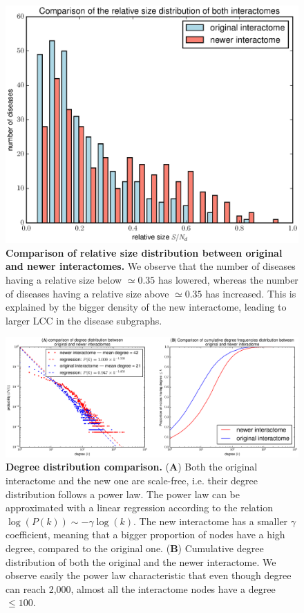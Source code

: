 \documentclass[letterpaper]{article}
\begin{document}
	\begin{figure}[!h]
		\centering
		\includegraphics[width=.5\textwidth]{images/rel_sizes_comparison.eps}
		\vspace{-.5cm}
		\caption{{\bf Comparison of relative size distribution between original and newer interactomes.}
		We observe that the number of diseases having a relative size below $\simeq 0.35$ has lowered, whereas the number
		of diseases having a relative size above $\simeq 0.35$ has increased. This is explained by the bigger density of
		the new interactome, leading to larger LCC in the disease subgraphs.
		\label{fig:rel sizes comparison}}
	\end{figure}

	\begin{figure}[!t]
		\hspace{-1.8cm}
		\vspace{-.5cm}
		\includegraphics[scale=.45]{images/degree_distributions_comparison.eps}
		\caption{{\bf Degree distribution comparison.} ({\bf A})  Both the original interactome and the new one
		are scale-free, i.e. their degree distribution follows a power law. The power law can be approximated
		with a linear regression according to the relation $\log(P(k)) \sim -\gamma\log(k)$. The new interactome
		has a smaller $\gamma$ coefficient, meaning that a bigger proportion of nodes have a high degree,
		compared to the original one.
		({\bf B}) Cumulative degree distribution of both the original and the newer interactome. We observe
		easily the power law characteristic that even though degree can reach 2,000, almost all the interactome
		nodes have a degree $\leq 100$.
		\label{fig:degree distribution comparison}}
		\vspace{-.5cm}
	\end{figure}
\end{document}

